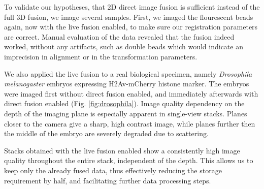 To validate our hypotheses, that 2D direct image fusion is sufficient instead of the full 3D fusion, we image several samples. First, we imaged the flourescent beads again, now with the live fusion enabled, to make sure our registration parameters are correct. Manual evaluation of the data revealed that the fusion indeed worked, without any artifacts, such as double beads which would indicate an imprecision in alignment or in the transformation parameters.

We also applied the live fusion to a real biological specimen, namely \textit{Drosophila melanogaster} embryos expressing H2Av-mCherry histone marker. The embryos were imaged first without direct fusion enabled, and immediately afterwards with direct fusion enabled (Fig. \ref{fig:drosophila}). Image quality dependency on the depth of the imaging plane is especially apparent in single-view stacks. Planes closer to the camera give a sharp, high contrast image, while planes further then the middle of the embryo are severely degraded due to scattering.

Stacks obtained with the live fusion enabled show a consistently high image quality throughout the entire stack, independent of the depth. This allows us to keep only the already fused data, thus effectively reducing the storage requirement by half, and facilitating further data processing steps. 




